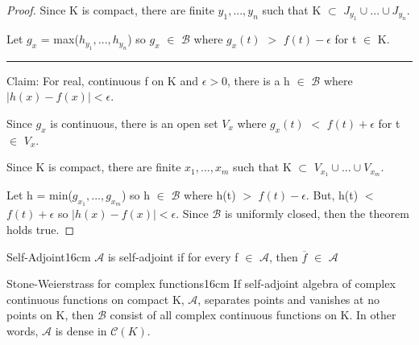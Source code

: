 \begin{proof}
        Since K is compact, there are finite $y_1,...,y_n$ such that
        K $\subset$ $J_{y_1} \cup ... \cup J_{y_n}$.

        Let $g_x$ = max($h_{y_1},...,h_{y_n}$) so $g_x$ $\in$ $\mathscr{B}$
        where $g_x(t)$ $>$ $f(t) - \epsilon$ for t $\in$ K.

        \rule[0.1cm]{15.3cm}{0.01cm}

        Claim: For real, continuous f on K and  $\epsilon > 0$, there is
        a h $\in$ $\mathscr{B}$ where $|h(x) - f(x)| < \epsilon$.

        Since $g_x$ is continuous, there is an open set $V_x$ where
        $g_x(t)$ $<$ $f(t) + \epsilon$ for t $\in$ $V_x$.

        Since K is compact, there are finite $x_1,...,x_m$ such that
        K $\subset$ $V_{x_1} \cup ... \cup V_{x_m}$.

        Let h = min($g_{x_1},...,g_{x_m}$) so h $\in$ $\mathscr{B}$
        where h(t) $>$ $f(t) - \epsilon$.
        But, h(t) $<$ $f(t) + \epsilon$ so
        $|h(x) - f(x)| < \epsilon$.
        Since $\mathscr{B}$ is uniformly closed, then the theorem holds true.
    \end{proof}

    \newpage



    \begin{definition}{Self-Adjoint}{16cm}
        $\mathscr{A}$ is {\color{lblue} self-adjoint} if
        for every f $\in$ $\mathscr{A}$, then $\overline{f}$ $\in$ $\mathscr{A}$
    \end{definition}

    \vspace{0.5cm}



    \begin{wtheorem}{Stone-Weierstrass for complex functions}{16cm}
        If self-adjoint algebra of complex continuous functions on compact K,
        $\mathscr{A}$, separates points and vanishes at no points on K, then
        $\mathscr{B}$ consist of all complex continuous functions on K.
        In other words, $\mathscr{A}$ is dense in $\mathscr{C}(K)$.
    \end{wtheorem}

